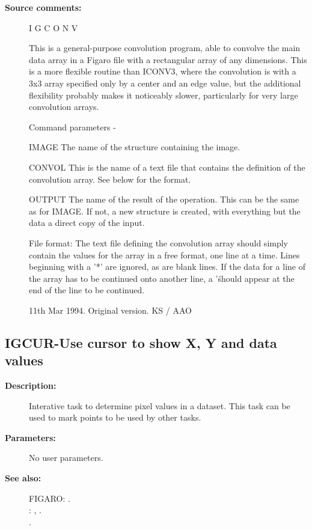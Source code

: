 \begin{description}
\begin{description}
\item [\textbf{Source comments:}]
\begin{terminalv}
 I G C O N V

 This is a general-purpose convolution program, able to convolve the
 main data array in a Figaro file with a rectangular array of any
 dimensions. This is a more flexible routine than ICONV3, where the
 convolution is with a 3x3 array specified only by a center and an
 edge value, but the additional flexibility probably makes it
 noticeably slower, particularly for very large convolution arrays.

 Command parameters -

 IMAGE    The name of the structure containing the image.

 CONVOL   This is the name of a text file that contains the
          definition of the convolution array. See below for the
          format.

 OUTPUT   The name of the result of the operation.  This can
          be the same as for IMAGE.  If not, a new structure
          is created, with everything but the data a direct
          copy of the input.

 File format:
    The text file defining the convolution array should simply contain
    the values for the array in a free format, one line at a time. Lines
    beginning with a '*' are ignored, as are blank lines. If the data for
    a line of the array has to be continued onto another line, a '\'
    should appear at the end of the line to be continued.

 11th Mar 1994.  Original version.  KS / AAO
\end{terminalv}
\end{description}
\subsection{IGCUR-\label{IGCUR}Use cursor to show X, Y and data values}
\begin{description}

\item [\textbf{Description:}]
 Interative task to determine pixel values in a dataset.
 This task can be used to mark points to be used by other
 tasks.

\item [\textbf{Parameters:}]
 No user parameters.

\item [\textbf{See also:}]
FIGARO: . \\
: , .\\
.\\



\end{description}
\end{description}
